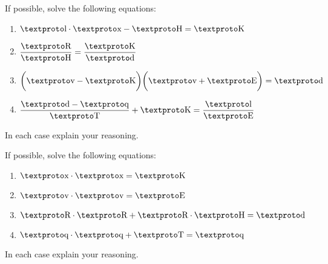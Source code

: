 \begin{prob} If possible, solve the following equations:
\begin{enumerate}
\item $\lh \cdot \lx - \lb = \ld$
\item $\dfrac{\ly}{\lb} = \dfrac{\ld}{\loo}$
\item $\bigg(\lz - \ld\bigg)\bigg(\lz + \lf\bigg)=\loo$
\item $\dfrac{\loo - \lw}{\lc} + \ld = \dfrac{\lh}{\lf}$
\end{enumerate}
In each case explain your reasoning.
\end{prob}

\begin{prob} If possible, solve the following equations:
\begin{enumerate}
\item $\lx \cdot \lx = \ld$
\item $\lz\cdot \lz = \lf$
\item $\ly\cdot \ly + \ly \cdot \lb = \loo$
\item $\lw \cdot \lw+ \lc = \lw$
\end{enumerate}
In each case explain your reasoning.
\end{prob}

